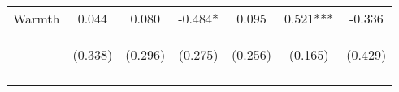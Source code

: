 \begin{tabular}{lcccccc}
\noalign{\smallskip}Warmth & 0.044 & 0.080 & -0.484* & 0.095 & 0.521*** & -0.336\\
 & \begin{footnotesize}(0.338)\end{footnotesize} & \begin{footnotesize}(0.296)\end{footnotesize} & \begin{footnotesize}(0.275)\end{footnotesize} & \begin{footnotesize}(0.256)\end{footnotesize} & \begin{footnotesize}(0.165)\end{footnotesize} & \begin{footnotesize}(0.429)\end{footnotesize}\\
\noalign{\smallskip}\hline\end{tabular}\\

